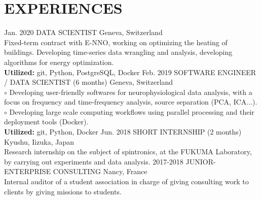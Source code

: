 \documentclass[]{cv-style}
\begin{document}
\section{EXPERIENCES}
\begin{entrylist}
%
\entry
{Jan. 2020}
{DATA SCIENTIST}
{Geneva, Switzerland}
{\\
    Fixed-term contract with E-NNO, working on optimizing the heating of
    buildings. Developing time-series data wrangling and analysis, developing
    algorithms for energy optimization.\\
    \textbf{Utilized:} git, Python, PostgreSQL, Docker
\vspace{0.1cm}
}
%
\entry
{Feb. 2019}
{SOFTWARE ENGINEER / DATA SCIENTIST (6 months)}
{Geneva, Switzerland}
{\\
    $\circ$ Developing user-friendly softwares for neurophysiological data
    analysis, with a focus on frequency and time-frequency analysis, source
    separation (PCA, ICA...).\\
    $\circ$ Developing large scale computing workflows using parallel 
    processing and their deployment tools (Docker).\\
    \textbf{Utilized:} git, Python, Docker
\vspace{0.1cm}
}
\entry
{Jun. 2018}
{SHORT INTERNSHIP (2 months)}
{Kyushu, Iizuka, Japan}
{\\
    Research internship on the subject of spintronics, at the FUKUMA
    Laboratory, by carrying out experiments and data analysis.
\vspace{0.1cm}
}
\entry
{2017-2018}
{JUNIOR-ENTERPRISE CONSULTING}
{Nancy, France}
{\\
    Internal auditor of a student association in charge of giving consulting
    work to clients by giving missions to students.\\
\vspace{0.1cm}
}
%
\end{entrylist}
\hphantom\\
%
\end{document}
